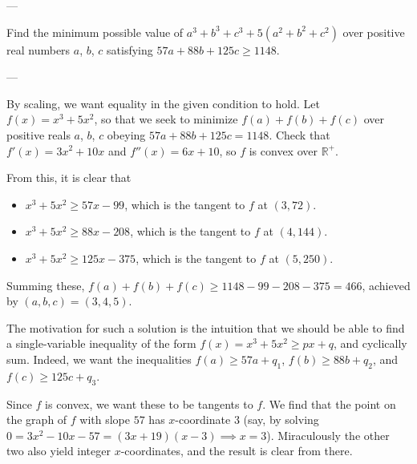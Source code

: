 
---

Find the minimum possible value of $a^3+b^3+c^3+5(a^2+b^2+c^2)$ over positive real numbers $a$, $b$, $c$ satisfying $57a+88b+125c\ge1148$.

---

By scaling, we want equality in the given condition to hold. Let $f(x)=x^3+5x^2$, so that we seek to minimize $f(a)+f(b)+f(c)$ over positive reals $a$, $b$, $c$ obeying $57a+88b+125c=1148$. Check that $f'(x)=3x^2+10x$ and $f''(x)=6x+10$, so $f$ is convex over $\mathbb R^+$.

From this, it is clear that
\begin{itemize}[itemsep=0em]
    \item $x^3+5x^2\ge57x-99$, which is the tangent to $f$ at $(3,72)$.
    \item $x^3+5x^2\ge88x-208$, which is the tangent to $f$ at $(4,144)$.
    \item $x^3+5x^2\ge125x-375$, which is the tangent to $f$ at $(5,250)$.
\end{itemize}
Summing these, $f(a)+f(b)+f(c)\ge1148-99-208-375=466$, achieved by $(a,b,c)=(3,4,5)$.
\begin{boxremark}
    The motivation for such a solution is the intuition that we should be able to find a single-variable inequality of the form $f(x)=x^3+5x^2\ge px+q$, and cyclically sum. Indeed, we want the inequalities $f(a)\ge 57a+q_1$, $f(b)\ge 88b+q_2$, and $f(c)\ge 125c+q_3$.

    Since $f$ is convex, we want these to be tangents to $f$. We find that the point on the graph of $f$ with slope $57$ has $x$-coordinate $3$ (say, by solving $0=3x^2-10x-57=(3x+19)(x-3)\implies x=3$). Miraculously the other two also yield integer $x$-coordinates, and the result is clear from there.
\end{boxremark}

